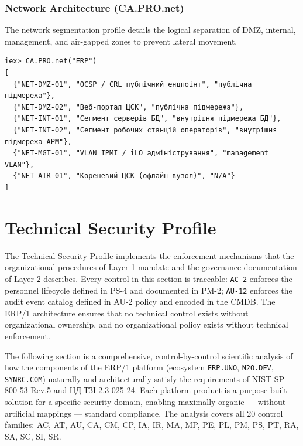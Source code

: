 \documentclass{article}
\begin{document}
\subsubsection{Network Architecture (CA.PRO.net)}
The network segmentation profile details the logical separation of DMZ, internal, management, and air-gapped zones to prevent lateral movement.
{\scriptsize
{}
\begin{verbatim}
iex> CA.PRO.net("ERP")
[
  {"NET-DMZ-01", "OCSP / CRL публічний ендпоінт", "публічна підмережа"},
  {"NET-DMZ-02", "Веб-портал ЦСК", "публічна підмережа"},
  {"NET-INT-01", "Сегмент серверів БД", "внутрішня підмережа БД"},
  {"NET-INT-02", "Сегмент робочих станцій операторів", "внутрішня підмережа АРМ"},
  {"NET-MGT-01", "VLAN IPMI / iLO адміністрування", "management VLAN"},
  {"NET-AIR-01", "Кореневий ЦСК (офлайн вузол)", "N/A"}
]
\end{verbatim}
}


\newpage
\section{Technical Security Profile}


The Technical Security Profile implements the enforcement mechanisms that the organizational procedures of Layer 1 mandate and the governance documentation of Layer 2 describes. Every control in this section is traceable: \texttt{AC-2} enforces the personnel lifecycle defined in PS-4 and documented in PM-2; \texttt{AU-12} enforces the audit event catalog defined in AU-2 policy and encoded in the CMDB. The ERP/1 architecture ensures that no technical control exists without organizational ownership, and no organizational policy exists without technical enforcement.


The following section is a comprehensive, control-by-control scientific analysis of how the components of the ERP/1 platform (ecosystem \texttt{ERP.UNO}, \texttt{N2O.DEV}, \texttt{SYNRC.COM}) naturally and architecturally satisfy the requirements of NIST SP 800-53 Rev.5 and \foreignlanguage{ukrainian}{\foreignlanguage{ukrainian}{НД \foreignlanguage{ukrainian}{ТЗІ}} 2.3-025-24}.
Each platform product is a purpose-built solution for a specific security domain, enabling maximally organic --- without artificial mappings --- standard compliance. The analysis covers all 20 control families: AC, AT, AU, CA, CM, CP, IA, IR, MA, MP, PE, PL, PM, PS, PT, RA, SA, SC, SI, SR.
\end{document}
